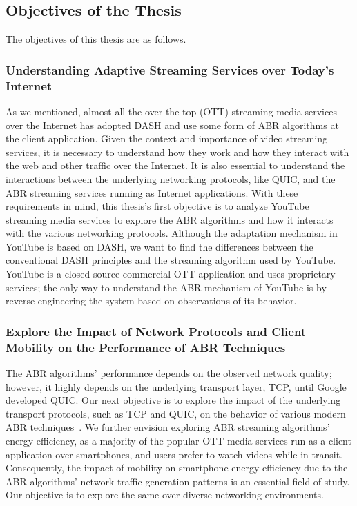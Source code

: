 \subsection{Objectives of the Thesis}
The objectives of this thesis are as follows. 

\subsubsection{Understanding Adaptive Streaming Services over Today's Internet}
As we mentioned, almost all the over-the-top (OTT) streaming media services over the Internet has adopted DASH and use some form of ABR algorithms at the client application. Given the context and importance of video streaming services, it is necessary to understand how they work and how they interact with the web and other traffic over the Internet. It is also essential to understand the interactions between the underlying networking protocols, like QUIC, and the ABR streaming services running as Internet applications. With these requirements in mind, this thesis's first objective is to analyze YouTube streaming media services to explore the ABR algorithms and how it interacts with the various networking protocols. Although the adaptation mechanism in YouTube is based on DASH, we want to find the differences between the conventional DASH principles and the streaming algorithm used by YouTube. YouTube is a closed source commercial OTT application and uses proprietary services; the only way to understand the ABR mechanism of YouTube is by reverse-engineering the system based on observations of its behavior. 

\subsubsection{Explore the Impact of Network Protocols and Client Mobility on the Performance of ABR Techniques}
The ABR algorithms' performance depends on the observed network quality; however, it highly depends on the underlying transport layer, TCP, until Google developed QUIC. Our next objective is to explore the impact of the underlying transport protocols, such as TCP and QUIC, on the behavior of various modern ABR techniques~\cite{Spiteri2016,Mao2017}. We further envision exploring ABR streaming algorithms' energy-efficiency, as a majority of the popular OTT media services run as a client application over smartphones, and users prefer to watch videos while in transit. Consequently, the impact of mobility on smartphone energy-efficiency due to the ABR algorithms' network traffic generation patterns is an essential field of study. Our objective is to explore the same over diverse networking environments.  


